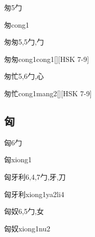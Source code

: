 \begin{Entry}{匆}{5}{⼓}
  \begin{Phonetics}{匆}{cong1}
  \end{Phonetics}
\end{Entry}

\begin{Entry}{匆匆}{5,5}{⼓,⼓}
  \begin{Phonetics}{匆匆}{cong1cong1}[][HSK 7-9]
  \end{Phonetics}
\end{Entry}

\begin{Entry}{匆忙}{5,6}{⼓,⼼}
  \begin{Phonetics}{匆忙}{cong1mang2}[][HSK 7-9]
  \end{Phonetics}
\end{Entry}

\subsection*{匈}

\begin{Entry}{匈}{6}{⼓}
  \begin{Phonetics}{匈}{xiong1}
  \end{Phonetics}
\end{Entry}

\begin{Entry}{匈牙利}{6,4,7}{⼓,⽛,⼑}
  \begin{Phonetics}{匈牙利}{xiong1ya2li4}
  \end{Phonetics}
\end{Entry}

\begin{Entry}{匈奴}{6,5}{⼓,⼥}
  \begin{Phonetics}{匈奴}{xiong1nu2}
  \end{Phonetics}
\end{Entry}


